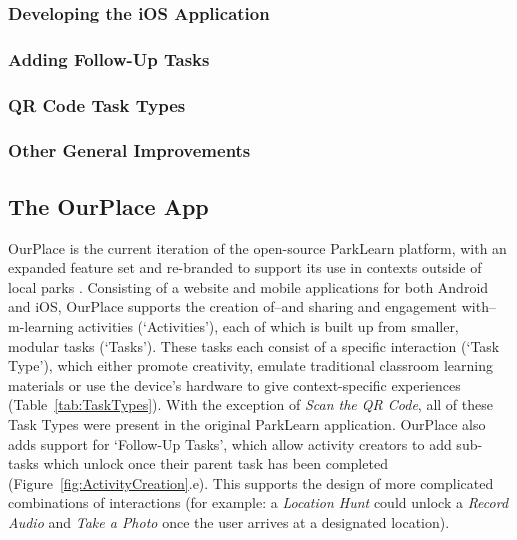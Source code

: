 \subsubsection{Developing the iOS Application}

\subsubsection{Adding Follow-Up Tasks}

\subsubsection{QR Code Task Types}

\subsubsection{Other General Improvements}


\subsection{The OurPlace App}

OurPlace is the current iteration of the open-source ParkLearn platform, with an expanded feature set and re-branded to support its use in contexts outside of local parks \citep{Richardson2018a}. Consisting of a website and mobile applications for both Android and iOS, OurPlace supports the creation of--and sharing and engagement with--m-learning activities (`Activities'), each of which is built up from smaller, modular tasks (`Tasks'). These tasks each consist of a specific interaction (`Task Type'), which either promote creativity, emulate traditional classroom learning materials or use the device's hardware to give context-specific experiences (Table~\ref{tab:TaskTypes}). With the exception of \textit{Scan the QR Code}, all of these Task Types were present in the original ParkLearn application. OurPlace also adds support for `Follow-Up Tasks', which allow activity creators to add sub-tasks which unlock once their parent task has been completed (Figure~\ref{fig:ActivityCreation}.e). This supports the design of more complicated combinations of interactions (for example: a \textit{Location Hunt} could unlock a \textit{Record Audio} and \textit{Take a Photo} once the user arrives at a designated location).

